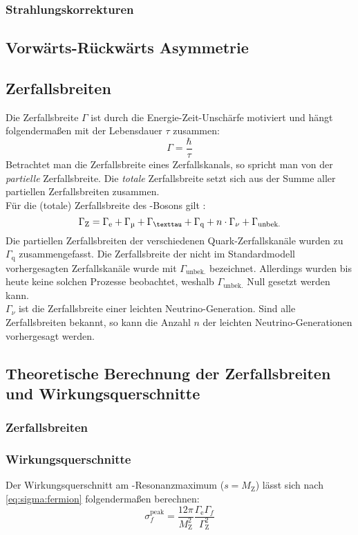 \subsubsection*{Strahlungskorrekturen}
\subsection{Vorwärts-Rückwärts Asymmetrie}
\subsection{Zerfallsbreiten}
\label{sub:theo:gamma}
Die Zerfallsbreite $\Gamma$ ist durch die Energie-Zeit-Unschärfe motiviert und hängt folgendermaßen mit der Lebensdauer $\tau$ zusammen:
\begin{equation}
    \Gamma = \frac{\hbar}{\tau}
\end{equation}
Betrachtet man die Zerfallsbreite eines Zerfallskanals, so spricht man von der \emph{partielle} Zerfallsbreite. Die \emph{totale} Zerfallsbreite 
setzt sich aus der Summe aller partiellen Zerfallsbreiten zusammen. \\
Für die (totale) Zerfallsbreite des \Z-Bosons gilt \cite{manual}:
\begin{equation}
    \Gamma_\text{Z} = \Gamma_\text{e} + \Gamma_\text{\textmu} + \Gamma_\text{\texttau} + \Gamma_\text{q} + n \cdot \Gamma_\nu + \Gamma_\text{unbek.}
\end{equation}
Die partiellen Zerfallsbreiten der verschiedenen Quark-Zerfallskanäle wurden zu $\Gamma_\text{q}$ zusammengefasst. Die Zerfallsbreite der 
nicht im Standardmodell vorhergesagten Zerfallskanäle wurde mit $\Gamma_\text{unbek.}$ bezeichnet. Allerdings wurden bis heute keine solchen 
Prozesse beobachtet, weshalb $\Gamma_\text{unbek.}$ Null gesetzt werden kann.\\
$\Gamma_\nu$ ist die Zerfallsbreite einer leichten Neutrino-Generation. Sind alle Zerfallsbreiten bekannt, so kann die Anzahl $n$ der leichten 
Neutrino-Generationen vorhergesagt werden.

\subsection{Theoretische Berechnung der Zerfallsbreiten und Wirkungsquerschnitte}
\subsubsection*{Zerfallsbreiten}
\subsubsection{Wirkungsquerschnitte}
Der Wirkungsquerschnitt am \Z-Resonanzmaximum ($s = M_\text{Z}$) lässt sich nach \autoref{eq:sigma:fermion} folgendermaßen berechnen:
\begin{equation}
    \sigma_f^\text{peak} = \frac{12 \pi}{M_\text{Z}^2} \frac{\Gamma_\text{e} \Gamma_f}{\Gamma_\text{Z}^2}
\end{equation}